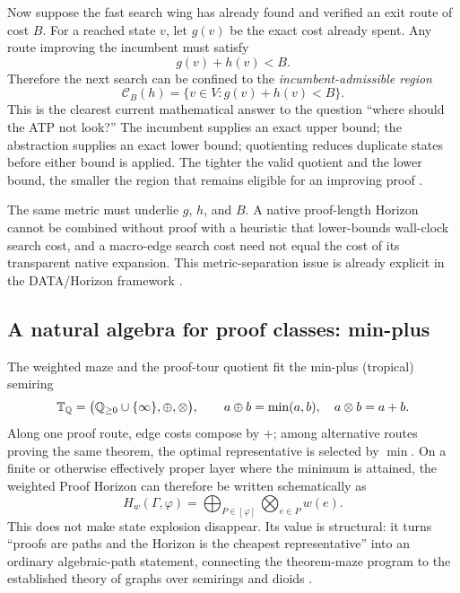 Now suppose the fast search wing has already found and verified an exit route of cost $B$. For a reached state $v$, let $g(v)$ be the exact cost already spent. Any route improving the incumbent must satisfy
\[
g(v)+h(v)<B.
\]
Therefore the next search can be confined to the \emph{incumbent-admissible region}
\[
\boxed{
\mathcal C_B(h)=\{v\in V:g(v)+h(v)<B\}.
}
\]
This is the clearest current mathematical answer to the question ``where should the ATP not look?'' The incumbent supplies an exact upper bound; the abstraction supplies an exact lower bound; quotienting reduces duplicate states before either bound is applied. The tighter the valid quotient and the lower bound, the smaller the region that remains eligible for an improving proof \cite{astar,korffelner,horizon}.

\begin{caution}
The same metric must underlie $g$, $h$, and $B$. A native proof-length Horizon cannot be combined without proof with a heuristic that lower-bounds wall-clock search cost, and a macro-edge search cost need not equal the cost of its transparent native expansion. This metric-separation issue is already explicit in the DATA/Horizon framework \cite{data3}.
\end{caution}

\subsection{A natural algebra for proof classes: min-plus}
The weighted maze and the proof-tour quotient fit the min-plus (tropical) semiring
\[
\mathbb T_{\mathbb Q}
=\bigl(\mathbb{Q}_{\ge 0}\cup\{\infty\},\oplus,\otimes\bigr),
\qquad
a\oplus b=\min(a,b),\quad a\otimes b=a+b.
\]
Along one proof route, edge costs compose by $+$; among alternative routes proving the same theorem, the optimal representative is selected by $\min$. On a finite or otherwise effectively proper layer where the minimum is attained, the weighted Proof Horizon can therefore be written schematically as
\[
\boxed{
H_w(\Gamma,\varphi)
=
\bigoplus_{P\in[\varphi]}
\bigotimes_{e\in P} w(e).
}
\]
This does not make state explosion disappear. Its value is structural: it turns ``proofs are paths and the Horizon is the cheapest representative'' into an ordinary algebraic-path statement, connecting the theorem-maze program to the established theory of graphs over semirings and dioids \cite{gondranminoux}.

